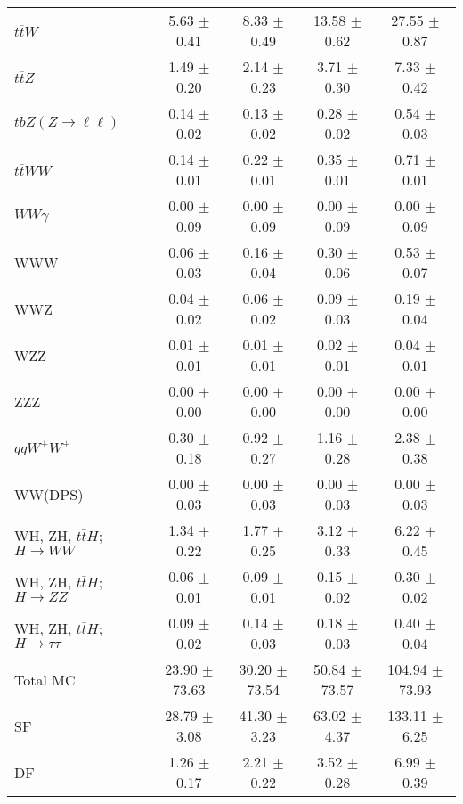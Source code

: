 \begin{tabular}{l|cccc}
                   $t\overline{t}W$ &  5.63 $\pm$  0.41 &  8.33 $\pm$  0.49 & 13.58 $\pm$  0.62 & 27.55 $\pm$  0.87 \\
                   $t\overline{t}Z$ &  1.49 $\pm$  0.20 &  2.14 $\pm$  0.23 &  3.71 $\pm$  0.30 &  7.33 $\pm$  0.42 \\
    $tbZ (Z \rightarrow \ell \ell)$ &  0.14 $\pm$  0.02 &  0.13 $\pm$  0.02 &  0.28 $\pm$  0.02 &  0.54 $\pm$  0.03 \\
                  $t\overline{t}WW$ &  0.14 $\pm$  0.01 &  0.22 $\pm$  0.01 &  0.35 $\pm$  0.01 &  0.71 $\pm$  0.01 \\
                         $WW\gamma$ &  0.00 $\pm$  0.09 &  0.00 $\pm$  0.09 &  0.00 $\pm$  0.09 &  0.00 $\pm$  0.09 \\
                                WWW &  0.06 $\pm$  0.03 &  0.16 $\pm$  0.04 &  0.30 $\pm$  0.06 &  0.53 $\pm$  0.07 \\
                                WWZ &  0.04 $\pm$  0.02 &  0.06 $\pm$  0.02 &  0.09 $\pm$  0.03 &  0.19 $\pm$  0.04 \\
                                WZZ &  0.01 $\pm$  0.01 &  0.01 $\pm$  0.01 &  0.02 $\pm$  0.01 &  0.04 $\pm$  0.01 \\
                                ZZZ &  0.00 $\pm$  0.00 &  0.00 $\pm$  0.00 &  0.00 $\pm$  0.00 &  0.00 $\pm$  0.00 \\
                 $qqW^{\pm}W^{\pm}$ &  0.30 $\pm$  0.18 &  0.92 $\pm$  0.27 &  1.16 $\pm$  0.28 &  2.38 $\pm$  0.38 \\
                            WW(DPS) &  0.00 $\pm$  0.03 &  0.00 $\pm$  0.03 &  0.00 $\pm$  0.03 &  0.00 $\pm$  0.03 \\
WH, ZH, $t\bar{t}H$; $H \rightarrow WW$ &  1.34 $\pm$  0.22 &  1.77 $\pm$  0.25 &  3.12 $\pm$  0.33 &  6.22 $\pm$  0.45 \\
WH, ZH, $t\bar{t}H$; $H \rightarrow ZZ$ &  0.06 $\pm$  0.01 &  0.09 $\pm$  0.01 &  0.15 $\pm$  0.02 &  0.30 $\pm$  0.02 \\
WH, ZH, $t\bar{t}H$; $H \rightarrow \tau\tau$ &  0.09 $\pm$  0.02 &  0.14 $\pm$  0.03 &  0.18 $\pm$  0.03 &  0.40 $\pm$  0.04 \\
\hline\hline
                           Total MC & 23.90 $\pm$ 73.63 & 30.20 $\pm$ 73.54 & 50.84 $\pm$ 73.57 & 104.94 $\pm$ 73.93 \\
\hline
                                 SF & 28.79 $\pm$  3.08 & 41.30 $\pm$  3.23 & 63.02 $\pm$  4.37 & 133.11 $\pm$  6.25 \\
                                 DF &  1.26 $\pm$  0.17 &  2.21 $\pm$  0.22 &  3.52 $\pm$  0.28 &  6.99 $\pm$  0.39 \\

\end{tabular}
